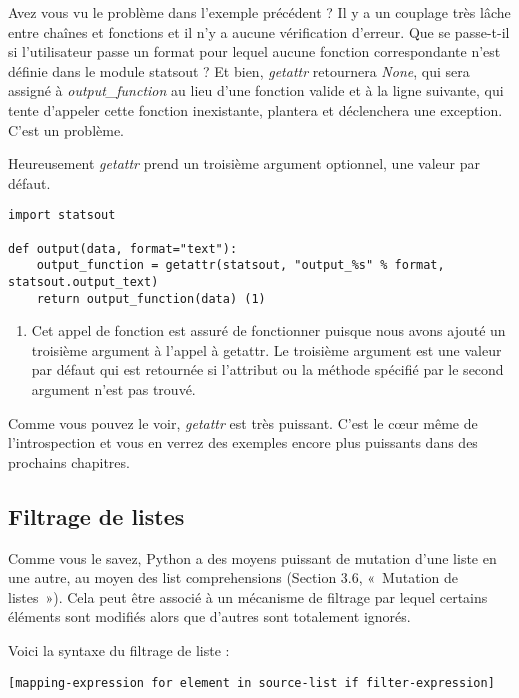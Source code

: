 Avez vous vu le problème dans l'exemple précédent ? Il y a un couplage très lâche entre chaînes et fonctions et il n'y a aucune vérification d'erreur. Que se passe-t-il si l'utilisateur passe un format pour lequel aucune fonction correspondante n'est définie dans le module statsout ? Et bien, \emph{getattr} retournera \emph{None}, qui sera assigné à  \emph{output\_function} au lieu d'une fonction valide et à la ligne suivante, qui tente d'appeler cette fonction inexistante, plantera et déclenchera une exception. C'est un problème.

Heureusement \emph{getattr} prend un troisième argument optionnel, une valeur par défaut.

\begin{example}
\begin{lstlisting}
import statsout

def output(data, format="text"):
    output_function = getattr(statsout, "output_%s" % format, statsout.output_text)
    return output_function(data) (1)
\end{lstlisting}
\end{example}

\begin{enumerate}
    \item{Cet appel de fonction est assuré de fonctionner puisque nous avons ajouté un troisième argument à l'appel à getattr. Le troisième argument est une valeur par défaut qui est retournée si l'attribut ou la méthode spécifié par le second argument n'est pas trouvé.}
\end{enumerate}

Comme vous pouvez le voir, \emph{getattr} est très puissant. C'est le cœur même de l'introspection et vous en verrez des exemples encore plus puissants dans des prochains chapitres.

\subsection{Filtrage de listes}

Comme vous le savez, Python a des moyens puissant de mutation d’une liste en une autre, au moyen des list comprehensions (Section 3.6, «~Mutation de listes~»). Cela peut être associé à un mécanisme de filtrage par lequel certains éléments sont modifiés alors que d’autres sont totalement ignorés. 

\medskip
\noindent Voici la syntaxe du filtrage de liste :
\begin{lstlisting}
[mapping-expression for element in source-list if filter-expression]
\end{lstlisting}

